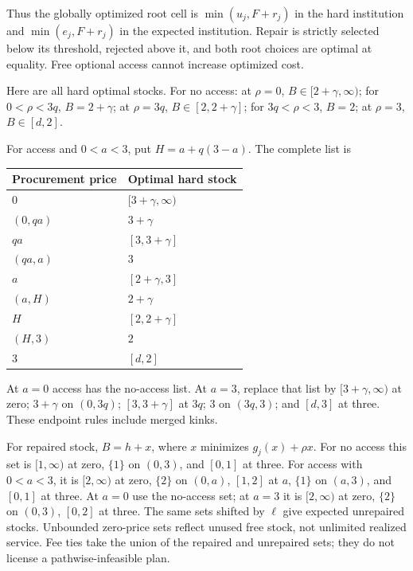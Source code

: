 \documentclass[
  11pt,
  a4paper,
]{article}
\begin{document}
Thus the globally optimized root cell is \(\min(u_j,F+r_j)\) in the hard
institution and \(\min(e_j,F+r_j)\) in the expected institution. Repair
is strictly selected below its threshold, rejected above it, and both
root choices are optimal at equality. Free optional access cannot
increase optimized cost.

Here are all hard optimal stocks. For no access: at \(\rho=0\),
\(B\in[2+\gamma,\infty)\); for \(0<\rho<3q\), \(B=2+\gamma\); at
\(\rho=3q\), \(B\in[2,2+\gamma]\); for \(3q<\rho<3\), \(B=2\); at
\(\rho=3\), \(B\in[d,2]\).

For access and \(0<a<3\), put \(H=a+q(3-a)\). The complete list is

\begin{longtable}[]{@{}ll@{}}
\toprule\noalign{}
Procurement price & Optimal hard stock \\
\midrule\noalign{}
\endhead
\bottomrule\noalign{}
\endlastfoot
\(0\) & \([3+\gamma,\infty)\) \\
\((0,qa)\) & \(3+\gamma\) \\
\(qa\) & \([3,3+\gamma]\) \\
\((qa,a)\) & \(3\) \\
\(a\) & \([2+\gamma,3]\) \\
\((a,H)\) & \(2+\gamma\) \\
\(H\) & \([2,2+\gamma]\) \\
\((H,3)\) & \(2\) \\
\(3\) & \([d,2]\) \\
\end{longtable}

At \(a=0\) access has the no-access list. At \(a=3\), replace that list
by \([3+\gamma,\infty)\) at zero; \(3+\gamma\) on \((0,3q)\);
\([3,3+\gamma]\) at \(3q\); \(3\) on \((3q,3)\); and \([d,3]\) at three.
These endpoint rules include merged kinks.

For repaired stock, \(B=h+x\), where \(x\) minimizes \(g_j(x)+\rho x\).
For no access this set is \([1,\infty)\) at zero, \(\{1\}\) on
\((0,3)\), and \([0,1]\) at three. For access with \(0<a<3\), it is
\([2,\infty)\) at zero, \(\{2\}\) on \((0,a)\), \([1,2]\) at \(a\),
\(\{1\}\) on \((a,3)\), and \([0,1]\) at three. At \(a=0\) use the
no-access set; at \(a=3\) it is \([2,\infty)\) at zero, \(\{2\}\) on
\((0,3)\), \([0,2]\) at three. The same sets shifted by \(\ell\) give
expected unrepaired stocks. Unbounded zero-price sets reflect unused
free stock, not unlimited realized service. Fee ties take the union of
the repaired and unrepaired sets; they do not license a
pathwise-infeasible plan.
\end{document}
